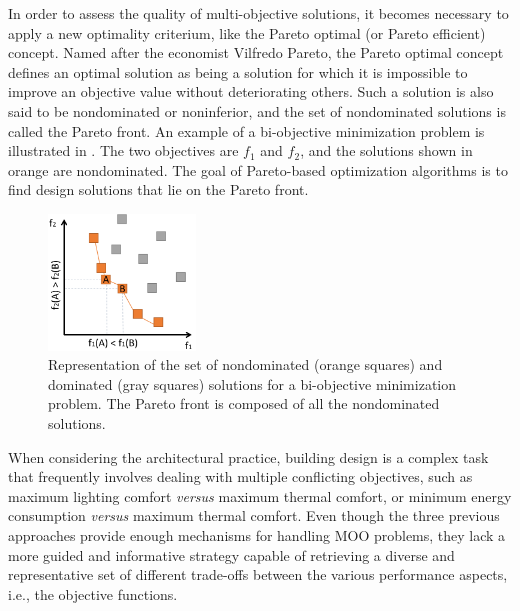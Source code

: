 	In order to assess the quality of multi-objective solutions, it becomes necessary to apply a new optimality criterium, like the Pareto optimal (or Pareto efficient) concept. Named after the economist Vilfredo Pareto, the Pareto optimal concept defines an optimal solution as being a solution for which it is impossible to improve an objective value without deteriorating others. Such a solution is also said to be nondominated or noninferior, and the set of nondominated solutions is called the Pareto front. An example of a bi-objective minimization problem is illustrated in . The two objectives are $f_1$ and $f_2$, and the solutions shown in orange are nondominated. The goal of Pareto-based optimization algorithms is to find design solutions that lie on the Pareto front.
	
	\begin{figure}
		\centering
		\includegraphics[width=0.35\textwidth]{Images/Background/pareto-front.PNG}
		\caption[Representation of a Pareto front example for a bi-objective optimization problem]{Representation of the set of nondominated (orange squares) and dominated (gray squares) solutions for a bi-objective minimization problem. The Pareto front is composed of all the nondominated solutions.}
		\label{fig:paretofrontier}
	\end{figure}
	
	When considering the architectural practice, building design is a complex task that frequently involves dealing with multiple conflicting objectives, such as maximum lighting comfort \textit{versus} maximum thermal comfort, or minimum energy consumption \textit{versus} maximum thermal comfort. Even though the three previous approaches provide enough mechanisms for handling \ac{MOO} problems, they lack a more guided and informative strategy capable of retrieving a diverse and representative set of different trade-offs between the various performance aspects, i.e., the objective functions.
	
